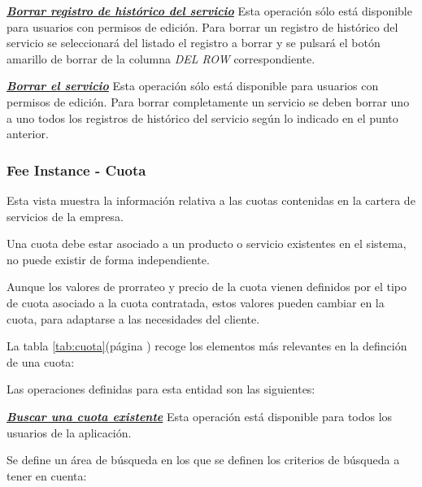 \underline{\textsl{\textbf{Borrar registro de histórico del servicio}}}\newline
Esta operación sólo está disponible para usuarios con permisos de edición.
Para borrar un registro de histórico del servicio se seleccionará del listado el registro a borrar y se pulsará el botón amarillo de borrar de la columna \textit{DEL ROW} correspondiente.\newline

\underline{\textsl{\textbf{Borrar el servicio}}}\newline
Esta operación sólo está disponible para usuarios con permisos de edición.
Para borrar completamente un servicio se deben borrar uno a uno todos los registros de histórico del servicio según lo indicado en el punto anterior. 



\subsubsection{Fee Instance - Cuota}
\label{sub:fee}

Esta vista muestra la información relativa a las cuotas contenidas en la cartera de servicios de la empresa.

Una cuota debe estar asociado a un producto o servicio existentes en el sistema, no puede existir de forma independiente.

Aunque los valores de prorrateo y precio de la cuota vienen definidos por el tipo de cuota asociado a la cuota contratada, estos valores pueden cambiar en la cuota, para adaptarse a las necesidades del cliente.


La tabla \ref{tab:cuota}(página \pageref{tab:cuota}) recoge los elementos más relevantes en la definción de una cuota:



Las operaciones definidas para esta entidad son las siguientes:


\underline{\textsl{\textbf{Buscar una cuota existente}}}\newline
Esta operación está disponible para todos los usuarios de la aplicación.

Se define un área de búsqueda en los que se definen los criterios de búsqueda a tener en cuenta:

